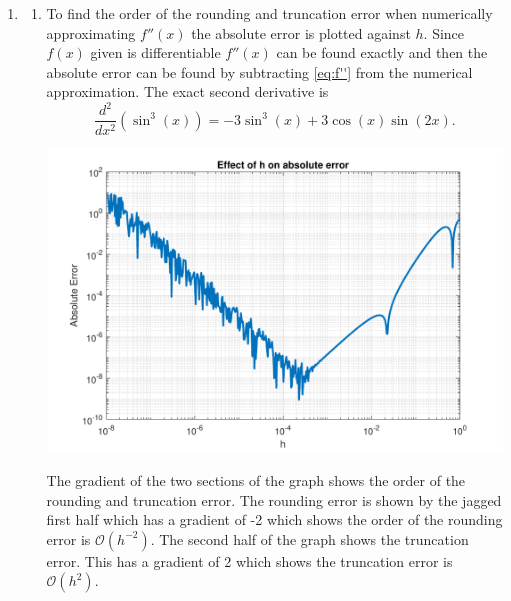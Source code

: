 \documentclass[a4paper,11pt]{article}
\begin{document}
\begin{enumerate}
	
	\item \begin{enumerate}
		\item To find the order of the rounding and truncation error when 
		numerically approximating $f''(x)$ the absolute error is plotted 
		against $h$. Since $f(x)$ given is differentiable 
		$f''(x)$ can be found exactly and then the absolute error can be 
		found by subtracting \autoref{eq:f''} from the numerical 
		approximation. The exact second derivative is
		\begin{equation}
			\frac{d^{2}}{dx^{2}}(\sin^{3}(x)) = -3\sin^{3}(x) + 
			3\cos(x)\sin(2x).
			\label{eq:f''}
		\end{equation}
		\begin{center}
			\includegraphics[scale=0.7]{images/Q2bi.pdf}
		\end{center}
		The gradient of the two sections of the graph shows the order of the 
		rounding and truncation error. The rounding error is shown by the 
		jagged first half which has a gradient of -2 which shows the order of 
		the rounding error is $\mathcal{O}(h^{-2})$. The second half of the 
		graph shows the truncation error. This has a gradient of 2 which 
		shows the truncation error is $\mathcal{O}(h^{2})$.
		

\end{enumerate}
\end{enumerate}
\end{document}
